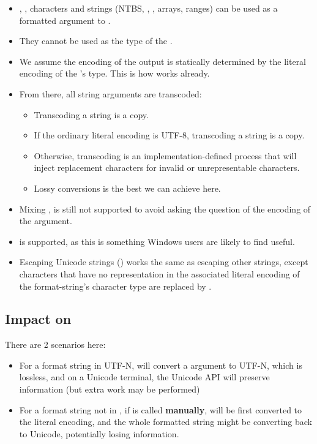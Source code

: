 \documentclass{wg21}
\begin{document}
\begin{itemize}
\item {}, ,  characters and strings (NTBS, , , arrays, ranges) can be
used as a formatted argument to .
\item They cannot be used as the type of the .
\item We assume the encoding of the output is statically determined by the literal encoding of the 's type.
This is how  works already.
\item From there, all string arguments are transcoded:
\begin{itemize}
\item Transcoding a  string is a copy.
\item If the ordinary literal encoding is UTF-8, transcoding a  string is a copy.
\item Otherwise, transcoding is an implementation-defined process that will inject replacement characters for invalid or unrepresentable characters.
\item Lossy conversions is the best we can achieve here.
\end{itemize}
\item Mixing ,  is still not supported to avoid asking the question of the encoding of the argument.
\item {} is supported, as this is something Windows users are likely to find useful.
\item Escaping Unicode strings () works the same as escaping other strings, except characters that have no
representation in the associated literal encoding of the format-string's character type are replaced by .
\end{itemize}

\subsection{Impact on }

There are 2 scenarios here:
\begin{itemize}
\item For a format string in UTF-N,  will convert a  argument to UTF-N, which is lossless, and on a Unicode terminal, the Unicode API will preserve information
(but extra work may be performed)
\item For a format string not in , if  is called \textbf{manually},  will be first converted to the literal encoding, and the whole formatted string might
be converting back to Unicode, potentially losing information.
\end{itemize}
\end{document}

